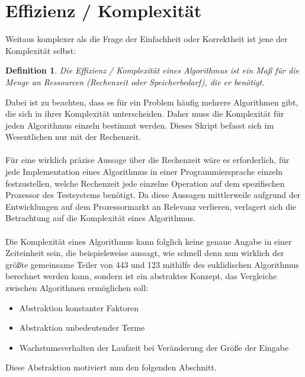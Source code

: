 \documentclass[11pt,a4paper]{scrartcl}
\newtheorem{definition}{Definition}
\begin{document}
\section{Effizienz / Komplexität}
Weitaus komplexer als die Frage der Einfachheit oder Korrektheit ist jene der Komplexität selbst:
\begin{definition}
Die Effizienz / Komplexität eines Algorithmus ist ein Maß für die Menge an Ressourcen (Rechenzeit oder Speicherbedarf), die er benötigt.
\end{definition}
Dabei ist zu beachten, dass es für ein Problem häufig mehrere Algorithmen gibt, die sich in ihrer Komplexität unterscheiden. Daher muss die Komplexität für jeden Algorithmus einzeln bestimmt werden. Dieses Skript befasst sich im Wesentlichen nur mit der Rechenzeit. \\\\
Für eine wirklich präzise Aussage über die Rechenzeit wäre es erforderlich, für jede Implementation eines Algorithmus in einer Programmiersprache einzeln festzustellen, welche Rechenzeit jede einzelne Operation auf dem spezifischen Prozessor des Testsystems benötigt. Da diese Aussagen mittlerweile aufgrund der Entwicklungen auf dem Prozessormarkt an Relevanz verlieren, verlagert sich die Betrachtung auf die Komplexität eines Algorithmus. \\\\
Die Komplexität eines Algorithmus kann folglich keine genaue Angabe in einer Zeiteinheit sein, die beispielsweise aussagt, wie schnell denn nun wirklich der größte gemeinsame Teiler von 443 und 123 mithilfe des euklidischen Algorithmus berechnet werden kann, sondern ist ein abstraktes Konzept, das Vergleiche zwischen Algorithmen ermöglichen soll:
\begin{itemize}
\item Abstraktion konstanter Faktoren
\item Abstraktion unbedeutender Terme
\item Wachstumsverhalten der Laufzeit bei Veränderung der Größe der Eingabe
\end{itemize}
Diese Abstraktion motiviert nun den folgenden Abschnitt.
\end{document}
